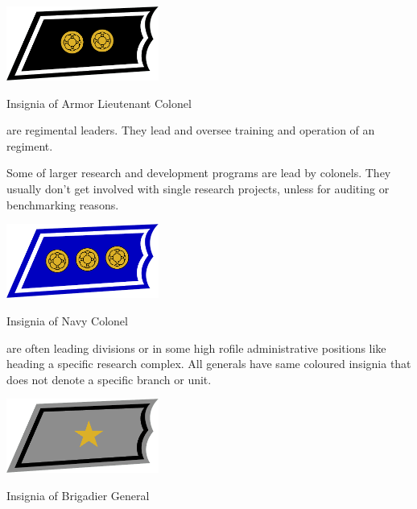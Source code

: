 \documentclass{tufte-book}
\begin{document}

\begin{marginfigure}[0\baselineskip]
  \includegraphics[width=5.0cm]{rank-lieutenant-colonel}
  \caption{Insignia of Armor Lieutenant Colonel}
  \label{fig:insignia_lieutenant_colonel}
\end{marginfigure}


 are regimental leaders. They lead and oversee training
and operation of an regiment.

Some of larger research and development programs are lead by colonels. They
usually don't get involved with single research projects, unless for auditing
or benchmarking reasons.

\begin{marginfigure}[0\baselineskip]
  \includegraphics[width=5.0cm]{rank-colonel}
  \caption{Insignia of Navy Colonel}
  \label{fig:insignia_colonel}
\end{marginfigure}

 are often leading divisions or in some high 
rofile administrative positions like heading a specific research complex.
All generals have same coloured insignia that does not denote a specific
branch or unit.

\begin{marginfigure}[0\baselineskip]
  \includegraphics[width=5.0cm]{rank-brigadier-general}
  \caption{Insignia of Brigadier General}
  \label{fig:insignia_brigadier_general}
\end{marginfigure}

\end{document}
